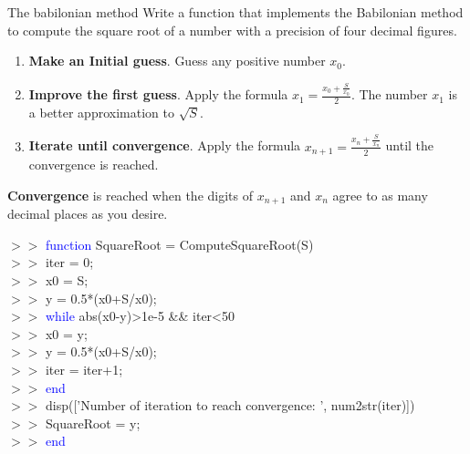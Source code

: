 \documentclass[xcolor={dvipsnames,rgb}, aspectratio=169]{beamer}
\begin{document}
\begin{frame}{The babilonian method}
    \textcolor{mylilas}{Write a function that implements the Babilonian method to compute the
        square root of a number with a precision of four decimal figures}.
    \begin{enumerate}
        \item \textbf{Make an Initial guess}.
              Guess any positive number $x_{0}$.
        \item \textbf{Improve the first guess}.
              Apply the formula $x_{1} = \frac{x_{0} + \frac{S}{x_{0}}}{2}$. The number $x_{1}$
              is a better approximation to $\sqrt{S}$.
        \item \textbf{Iterate until convergence}.
              Apply the formula $x_{n+1} = \frac{x_{n} + \frac{S}{x_{n}}}{2}$ until the
              convergence is reached.
    \end{enumerate}
    \textbf{Convergence} is reached when the digits of $x_{n+1}$ and $x_{n}$ agree to as many
    decimal places as you desire.
\end{frame}

\begin{frame}{}
    \begin{tcolorbox}[colback=white,colframe=bluepoli]
        $>>$ \textcolor{blue}{function} SquareRoot = ComputeSquareRoot(S)\\
        $>>$ \hspace{1em}iter = 0;\\
        $>>$ \hspace{1em}x0 = S;\\
        $>>$ \hspace{1em}y = 0.5*(x0+S/x0);\\
        $>>$ \hspace{1em}\textcolor{blue}{while} abs(x0-y)>1e-5 \&\& iter<50\\
        $>>$ \hspace{1em}\hspace{1em}x0 = y;\\
        $>>$ \hspace{1em}\hspace{1em}y = 0.5*(x0+S/x0);\\
        $>>$ \hspace{1em}\hspace{1em}iter = iter+1;\\
        $>>$ \hspace{1em}\textcolor{blue}{end}\\
        $>>$ \hspace{1em}disp(['Number of iteration to reach convergence: ', num2str(iter)])\\
        $>>$ \hspace{1em}SquareRoot = y;\\
        $>>$ \textcolor{blue}{end}\\
    \end{tcolorbox}
\end{frame}
\end{document}
